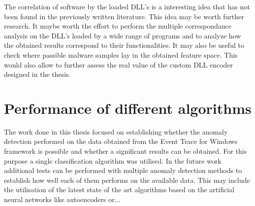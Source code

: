 \documentclass[a4paper,twoside,12pt]{book}
\newcounter{PagesWithoutNumbers}
\begin{document}
The correlation of software by the loaded DLL's is a interesting idea that has not been
found in the previously written literature. This idea may be worth further research. It maybe worth
the effort to perform the multiple correspondance analysis on the DLL's loaded by a wide range 
of programs and to analyze how the obtained results correspond to their functionalities. It may also
be useful to check where passible malware samples lay in the obtained feature space. This would also
allow to further assess the real value of the custom DLL encoder designed in the thesis. 

\section{Performance of different algorithms}

The work done in this thesis focused on establishing whether the anomaly detection performed on the
data obtained from the Event Trace for Windows framework is possible and whether a significant results
can be obtained. For this purpose a single classification algorithm was utilised. In the future work 
additional tests can be performed with multiple anomaly detection methods to establish how well each 
of them performs on the available data. This may include the utilisation of the latest state of the 
art algorithms based on the artificial neural networks like autoencoders or...






\backmatter
{}
\setcounter{page}{\value{PagesWithoutNumbers}}

\pagestyle{onlyPageNumbers}




\end{document}

